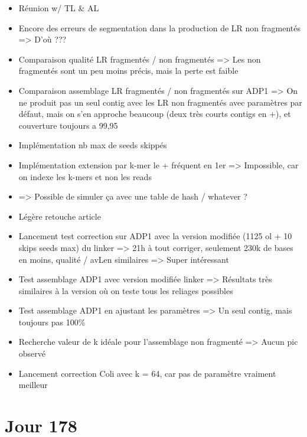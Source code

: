 \documentclass[12pt]{report}
\begin{document}
\begin{itemize}
	\item Réunion w/ TL \& AL
	
	\item Encore des erreurs de segmentation dans la production de LR non fragmentés => D'où ???
	
	\item Comparaison qualité LR fragmentés / non fragmentés => Les non fragmentés sont un peu moins précis,
		  mais la perte est faible
	
	\item Comparaison assemblage LR fragmentés / non fragmentés sur ADP1 => On ne produit pas un seul contig avec les
		  LR non fragmentés avec paramètres par défaut, mais on s'en approche beaucoup (deux très courts contigs en +),
		  et couverture toujours a 99,95
	
	\item Implémentation nb max de seeds skippés
	
	\item Implémentation extension par k-mer le + fréquent en 1er => Impossible, car on indexe les k-mers et non les reads
	
	\item => Possible de simuler ça avec une table de hash / whatever ?
	
	\item Légère retouche article
	
	\item Lancement test correction sur ADP1 avec la version modifiée (1125 ol + 10 skips seeds max) du linker => 21h à tout corriger,
		  seulement 230k de bases en moins, qualité / avLen similaires => Super intéressant
	
	\item Test assemblage ADP1 avec version modifiée linker => Résultats très similaires à la version où on teste tous les reliages
		  possibles
	
	\item Test assemblage ADP1 en ajustant les paramètres => Un seul contig, mais toujours pas 100\%
	
	\item Recherche valeur de k idéale pour l'assemblage non fragmenté => Aucun pic observé
	
	\item Lancement correction Coli avec k = 64, car pas de paramètre vraiment meilleur
\end{itemize}

\section{Jour 178}
\end{document}
